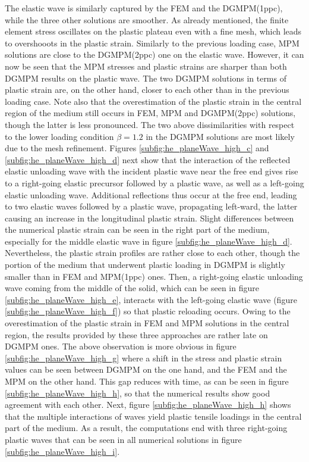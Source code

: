 The elastic wave is similarly captured by the FEM and the DGMPM(1ppc), while the three other solutions are smoother.
As already mentioned, the finite element stress oscillates on the plastic plateau even with a fine mesh, which leads to overshooots in the plastic strain.
Similarly to the previous loading case, MPM solutions are close to the DGMPM(2ppc) one on the elastic wave.
However, it can now be seen that the MPM stresses and plastic strains are sharper than both DGMPM results on the plastic wave.
The two DGMPM solutions in terms of plastic strain are, on the other hand, closer to each other than in the previous loading case.
Note also that the overestimation of the plastic strain in the central region of the medium still occurs in FEM, MPM and DGMPM(2ppc) solutions, though the latter is less pronounced.
The two above dissimilarities with respect to the lower loading condition $\beta=1.2$ in the DGMPM solutions are most likely due to the mesh refinement.
Figures \ref{subfig:he_planeWave_high_c} and \ref{subfig:he_planeWave_high_d} next show that the interaction of the reflected elastic unloading wave with the incident plastic wave near the free end gives rise to a right-going elastic precursor followed by a plastic wave, as well as a left-going elastic unloading wave.
Additional reflections thus occur at the free end, leading to two elastic waves followed by a plastic wave, propagating left-ward, the latter causing an increase in the longitudinal plastic strain.
Slight differences between the numerical plastic strain can be seen in the right part of the medium, especially for the middle elastic wave in figure \ref{subfig:he_planeWave_high_d}.
Nevertheless, the plastic strain profiles are rather close to each other, though the portion of the medium that underwent plastic loading in DGMPM is slightly smaller than in FEM and MPM(1ppc) ones.
Then, a right-going elastic unloading wave coming from the middle of the solid, which can be seen in figure \ref{subfig:he_planeWave_high_e}, interacts with the left-going elastic wave (figure \ref{subfig:he_planeWave_high_f}) so that plastic reloading occurs.
%
Owing to the overestimation of the plastic strain in FEM and MPM solutions in the central region, the results provided by these three approaches are rather late on DGMPM ones.
The above observation is more obvious in figure \ref{subfig:he_planeWave_high_g} where a shift in the stress and plastic strain values can be seen between DGMPM on the one hand, and the FEM and the MPM on the other hand.
%
This gap reduces with time, as can be seen in figure \ref{subfig:he_planeWave_high_h}, so that the numerical results show good agreement with each other.
Next, figure \ref{subfig:he_planeWave_high_h} shows that the multiple interactions of waves yield plastic tensile loadings in the central part of the medium.
As a result, the computations end with three right-going plastic waves that can be seen in all numerical solutions in figure \ref{subfig:he_planeWave_high_i}.



